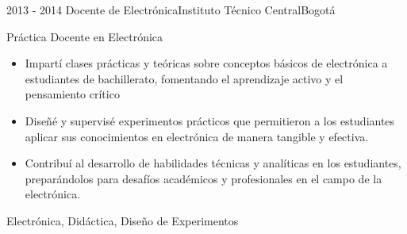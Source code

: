 \begin{experiences}
  \experience
  {2013 - 2014}  {Docente de Electrónica}{Instituto Técnico Central}{Bogotá}
  {}   {
          Práctica Docente en Electrónica  
          \begin{itemize}
            \item Impartí clases prácticas y teóricas sobre conceptos básicos de electrónica a estudiantes de bachillerato, fomentando el aprendizaje activo y el pensamiento crítico
            \item Diseñé y supervisé experimentos prácticos que permitieron a los estudiantes aplicar sus conocimientos en electrónica de manera tangible y efectiva.
            \item Contribuí al desarrollo de habilidades técnicas y analíticas en los estudiantes, preparándolos para desafíos académicos y profesionales en el campo de la electrónica. 
          \end{itemize}
     }
     {Electrónica, Didáctica, Diseño de Experimentos}
\end{experiences}
